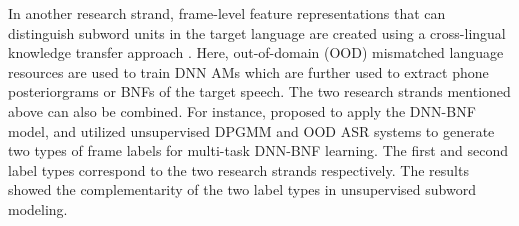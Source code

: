 \documentclass[a4paper]{article}
\begin{document}
In another research strand, frame-level feature representations that can distinguish subword units in the target language are created using a cross-lingual knowledge transfer approach \cite{feng2019_TASLP,shibata2017composite}. Here, out-of-domain (OOD) mismatched language resources are used to train DNN AMs which are further used to extract phone posteriorgrams or BNFs of the target speech.
The two research strands mentioned above can also be combined.
For instance, \cite{feng2019_TASLP} proposed to 
apply the DNN-BNF model, and  utilized  unsupervised   DPGMM  and OOD ASR systems  to  generate two types of frame labels for multi-task DNN-BNF learning. The first and second label types correspond to  the two research strands respectively. 
The results  showed the complementarity of the two label types in unsupervised subword modeling.
\end{document}
